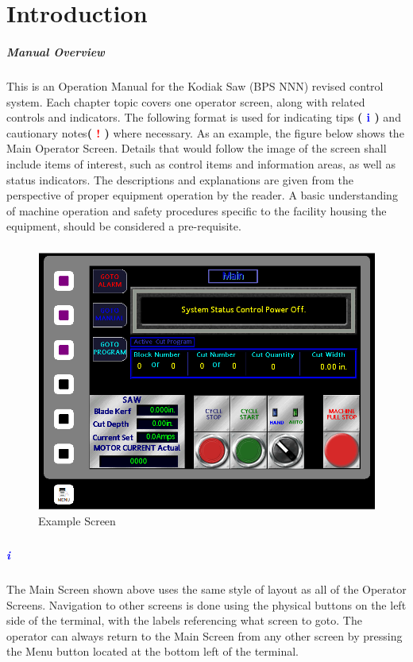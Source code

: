 \chapter{Introduction}

\paragraph{Manual Overview}

This is an Operation Manual for the Kodiak Saw (BPS NNN) revised control system. Each chapter topic covers one operator screen, along with related controls and indicators. The following format is used for indicating tips \textbf{\LARGE ( \textcolor{blue}{i} )} and cautionary notes\newline \textbf{{\LARGE ( \textcolor{red}{!} )}} where necessary. As an example, the figure below shows the Main Operator Screen. Details that would follow the image of the screen shall include items of interest, such as control items and information areas, as well as status indicators. The descriptions and explanations are given from the perspective of proper equipment operation by the reader. A basic understanding of machine operation and safety procedures specific to the facility housing the equipment, should be considered a pre-requisite.
\paragraph{}
\begin{figure}
		\centering
		\includegraphics[width=0.5\linewidth]{screen-captures/main-screen}
		\caption{Example Screen}
		\label{fig:example-screen}
\end{figure}
\paragraph{}
\paragraph*{\textbf{\LARGE \textcolor{blue}{i}}}The Main Screen shown above uses the same style of layout as all of the Operator Screens. Navigation to other screens is done using the physical buttons on the left side of the terminal, with the labels referencing what screen to goto. The operator can always return to the Main Screen from any other screen by pressing the Menu button located at the bottom left of the terminal.

